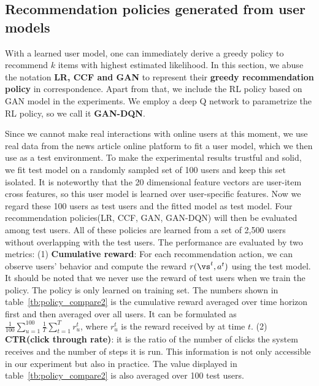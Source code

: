 \documentclass{article} %
\newcommand{\Li}[1]{{\color{cyan}{\bf\sf [Li: #1]}}}
\begin{document}
\vspace{-3mm}
\subsection{Recommendation policies generated from user models}\label{sec:experiment2}
\vspace{-3mm}

With a learned user model, one can immediately derive a greedy policy to recommend $k$ items with highest estimated likelihood. In this section, we abuse the notation {\bf LR, CCF and GAN} to represent their {\bf greedy recommendation policy} in correspondence. Apart from that, we include the RL policy based on GAN model in the experiments. We employ a deep Q network to parametrize the RL policy, so we call it {\bf GAN-DQN}.

Since we cannot make real interactions with online users at this moment, we use real data from the news article online platform to fit a user model, which we then use as a test environment. To make the experimental results trustful and solid, we fit test model on a randomly sampled set of 100 users and keep this set isolated. It is noteworthy that the 20 dimensional feature vectors are user-item cross features, so this user model is learned over user-specific features. Now we regard these 100 users as test users and the fitted model as test model. Four recommendation policies(LR, CCF, GAN, GAN-DQN) will then be evaluated among test users. All of these policies are learned from a set of 2,500 users without overlapping with the test users. The performance are evaluated by two metrics: {(1) \bf Cumulative reward}: For each recommendation action, we can observe users' behavior and compute the \Li{\st{her}} reward $r(\vs^t,a^t)$ using the test model.
It should be noted that we never use the reward of test users when we train the policy. The policy is only learned on training set. The numbers shown in table~\ref{tb:policy_compare2} is the cumulative reward averaged over time horizon first and then averaged over all users. It can be formulated as $\frac{1}{100}\sum_{u=1}^{100} \frac{1}{T}\sum_{t=1}^T r^t_u$, where $r^t_u$ is the reward received by at time $t$. (2) {\bf CTR(click through rate)}: it is the ratio of the number of clicks the system receives and the number of steps it is run. This information is not only accessible in our experiment but also in practice. The value displayed in table~\ref{tb:policy_compare2} is also averaged over 100 test users.
\end{document}
